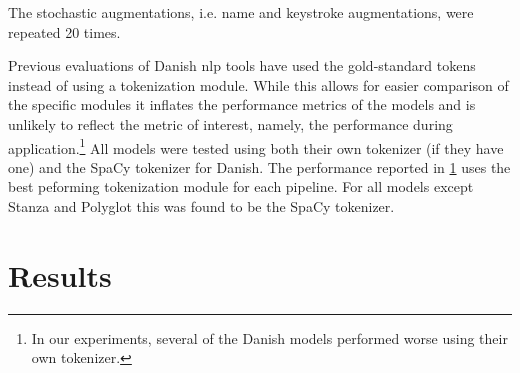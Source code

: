 \documentclass{article}
\begin{document}
The stochastic augmentations, i.e. name and keystroke augmentations, were repeated 20 times.

Previous evaluations of Danish \gls{nlp} tools have used the gold-standard tokens instead of using a tokenization module. While this allows for easier comparison of the specific modules it inflates the performance metrics of the models and is unlikely to reflect the metric of interest, namely, the performance during application.\footnote{In our experiments, several of the Danish models performed worse using their own tokenizer.} All models were tested using both their own tokenizer (if they have one) and the SpaCy tokenizer for Danish. The performance reported in \cref{sec:results} uses the best peforming tokenization module for each pipeline. For all models except Stanza and Polyglot this was found to be the SpaCy tokenizer. 
\section{Results}\label{sec:results}
\end{document}
